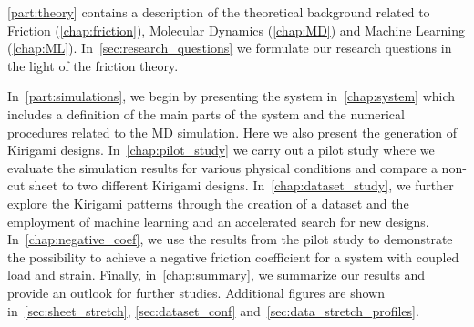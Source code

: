\cref{part:theory} contains a description of the theoretical background related
to Friction (\cref{chap:friction}), Molecular Dynamics (\cref{chap:MD}) and
Machine Learning (\cref{chap:ML}). In~\cref{sec:research_questions} we
formulate our research questions in the light of the friction theory.  

In~\cref{part:simulations}, we begin by presenting the system in~\cref{chap:system} which includes a definition of the main parts of the system and the numerical procedures related to the \acrshort{MD} simulation. Here we also present the generation of Kirigami designs. In~\cref{chap:pilot_study} we carry out a pilot
study where we evaluate the simulation results for
various physical conditions and compare a non-cut sheet to two different
Kirigami designs. In~\cref{chap:dataset_study}, we further explore the Kirigami patterns through the creation of a
dataset and the employment of machine learning and an accelerated search for new designs. In~\cref{chap:negative_coef}, we use
the results from the pilot study to demonstrate the possibility to achieve a
negative friction coefficient for a system with coupled load and strain. Finally, in~\cref{chap:summary}, we summarize our results and provide an outlook for further studies. Additional figures are shown
in~\cref{sec:sheet_stretch}, \cref{sec:dataset_conf} and~\cref{sec:data_stretch_profiles}. 











